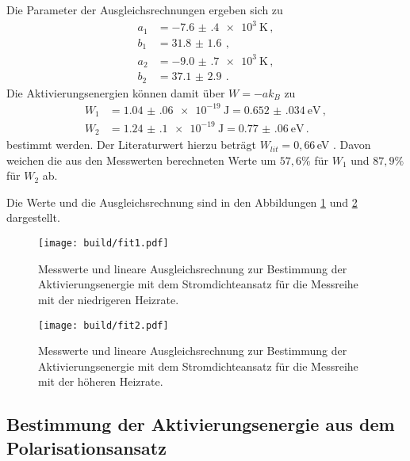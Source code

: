 Die Parameter
der Ausgleichsrechnungen ergeben sich zu
\begin{align*}
  a_1&=\SI{-7.6(4)e+3}{\kelvin} \,, \\
  b_1&=\SI{31.8(16)}{}  \,, \\
  a_2&=\SI{-9.0(7)e+3}{\kelvin} \,, \\
  b_2&=\SI{37.1(29)}{}  \,.
\end{align*}
Die Aktivierungsenergien können damit über $W=-ak_B$ zu
\begin{align*}
 W_1&=\SI{1.04(06)e-19}{\joule}= \SI{0.652(034)}{\eV}  \,, \\
 W_2&=\SI{1.24(10)e-19}{\joule}=\SI{0.77(06)}{\eV} \,.
\end{align*}
bestimmt werden. Der Literaturwert hierzu beträgt $W_{lit}=0{,}66\,$eV \cite{lit}. Davon weichen
die aus den Messwerten berechneten Werte um $57{,}6\%$ für $W_1$ und $87,9\%$ für
$W_2$ ab.

Die Werte und die Ausgleichsrechnung sind in den Abbildungen \ref{fig:fit1} und
\ref{fig:fit2} dargestellt.

\begin{figure}
  \centering
  \texttt{[image: build/fit1.pdf]}
  \caption{Messwerte und lineare Ausgleichsrechnung zur Bestimmung der Aktivierungsenergie mit dem Stromdichteansatz für
  die Messreihe mit der niedrigeren Heizrate.}
  \label{fig:fit1}
\end{figure}
\begin{figure}
  \centering
  \texttt{[image: build/fit2.pdf]}
  \caption{Messwerte und lineare Ausgleichsrechnung zur Bestimmung der Aktivierungsenergie mit dem Stromdichteansatz für
  die Messreihe mit der höheren Heizrate.}
  \label{fig:fit2}
\end{figure}

\newpage
\subsection{Bestimmung der Aktivierungsenergie aus dem Polarisationsansatz}

